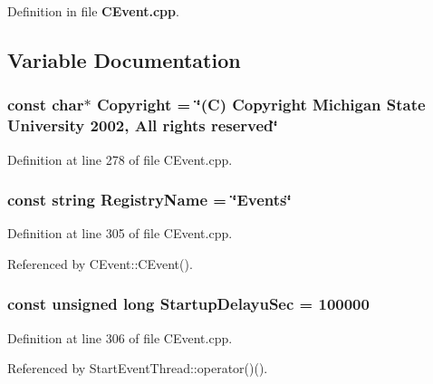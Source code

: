 Definition in file {\bf CEvent.cpp}.

\subsection{Variable Documentation}
\subsubsection{\setlength{\rightskip}{0pt plus 5cm}const char$\ast$ Copyright = \char`\"{}(C) Copyright Michigan State University 2002, All rights reserved\char`\"{}\hspace{0.3cm}{\tt  [static]}}\label{CEvent_8cpp_a0}




Definition at line 278 of file CEvent.cpp.
\subsubsection{\setlength{\rightskip}{0pt plus 5cm}const string Registry\-Name = \char`\"{}Events\char`\"{}\hspace{0.3cm}{\tt  [static]}}\label{CEvent_8cpp_a1}




Definition at line 305 of file CEvent.cpp.

Referenced by CEvent::CEvent().
\subsubsection{\setlength{\rightskip}{0pt plus 5cm}const unsigned long Startup\-Delayu\-Sec = 100000\hspace{0.3cm}{\tt  [static]}}\label{CEvent_8cpp_a2}




Definition at line 306 of file CEvent.cpp.

Referenced by Start\-Event\-Thread::operator()().